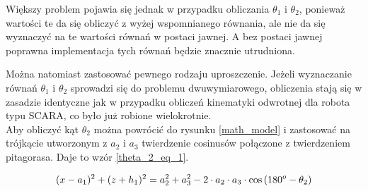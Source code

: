 




Większy problem pojawia się jednak w przypadku obliczania $\theta_1$ i $\theta_2$, ponieważ wartości te da się obliczyć z wyżej wspomnianego równania, ale nie da się wyznaczyć na te wartości równań w postaci jawnej. A bez postaci jawnej poprawna implementacja tych równań będzie znacznie utrudniona.

Można natomiast zastosować pewnego rodzaju uproszczenie. Jeżeli wyznaczanie równań $\theta_1$ i $\theta_2$ sprowadzi się do problemu dwuwymiarowego, obliczenia stają się w zasadzie identyczne jak w przypadku obliczeń kinematyki odwrotnej dla robota typu SCARA, co było już robione wielokrotnie. \cite{SCARA_model}\\

Aby obliczyć kąt $\theta_2$ można powrócić do rysunku \ref{math_model} i zastosować na trójkącie utworzonym z $a_2$ i $a_3$ twierdzenie cosinusów połączone z twierdzeniem pitagorasa. Daje to wzór \ref{theta_2_eq_1}. \cite{SCARA_model_calc}

\begin{equation} \label{theta_2_eq_1}
(x - a_1)^2 + (z + h_1)^2 = a_2^2 + a_3^2 - 2 \cdot a_2 \cdot a_3 \cdot \cos{(180^o - \theta_2)}\\
\end{equation}


